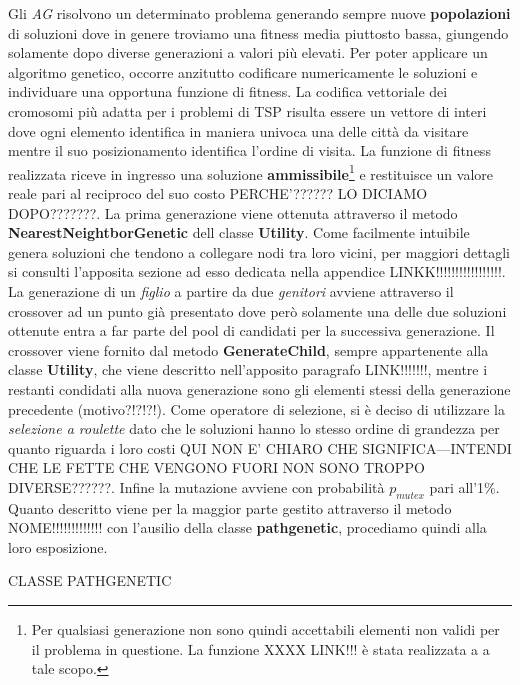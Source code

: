 \documentclass[11pt]{article}
\begin{document}
Gli \textit{AG} risolvono un determinato problema generando sempre nuove \textbf{popolazioni} di soluzioni dove in genere troviamo una fitness media piuttosto bassa, giungendo solamente dopo diverse generazioni a valori più elevati. Per poter applicare un algoritmo genetico, occorre anzitutto codificare numericamente le soluzioni e individuare una opportuna funzione di fitness. La codifica vettoriale dei cromosomi più adatta per i problemi di TSP risulta essere un vettore di interi dove ogni elemento identifica in maniera univoca una delle città da visitare mentre il suo posizionamento identifica l'ordine di visita.
La funzione di fitness realizzata riceve in ingresso una soluzione \textbf{ammissibile}\footnote{Per qualsiasi generazione non sono quindi accettabili elementi non validi per il problema in questione. La funzione XXXX LINK!!! è stata realizzata a a tale scopo.} e restituisce un valore reale pari al reciproco del suo costo PERCHE'?????? LO DICIAMO DOPO???????.
La prima generazione viene ottenuta attraverso il metodo \textbf{NearestNeightborGenetic} dell classe \textbf{Utility}. Come facilmente intuibile genera soluzioni che tendono a collegare nodi tra loro vicini, per maggiori dettagli si consulti l'apposita sezione ad esso dedicata nella appendice LINKK!!!!!!!!!!!!!!!!!.
La generazione di un \textit{figlio} a partire da due \textit{genitori} avviene attraverso il crossover ad un punto già presentato dove però solamente una delle due soluzioni ottenute entra a far parte del pool di candidati per la successiva generazione. Il crossover viene fornito dal metodo \textbf{GenerateChild}, sempre appartenente alla classe \textbf{Utility}, che viene descritto nell'apposito paragrafo LINK!!!!!!!, mentre i restanti condidati alla nuova generazione sono gli elementi stessi della generazione precedente (motivo?!?!?!).
Come operatore di selezione, si è deciso di utilizzare la \textit{selezione a roulette} dato che le soluzioni hanno lo stesso ordine di grandezza per quanto riguarda i loro costi QUI NON E' CHIARO CHE SIGNIFICA---INTENDI CHE LE FETTE CHE VENGONO FUORI NON SONO TROPPO DIVERSE??????. Infine la mutazione avviene con probabilità $p_{mutex}$ pari all'1\%.
Quanto descritto viene per la maggior parte gestito attraverso il metodo NOME!!!!!!!!!!!!! con l'ausilio della classe \textbf{pathgenetic}, procediamo quindi alla loro esposizione.

\vspace{2\baselineskip}
CLASSE PATHGENETIC
\vspace{2\baselineskip}
\end{document}
